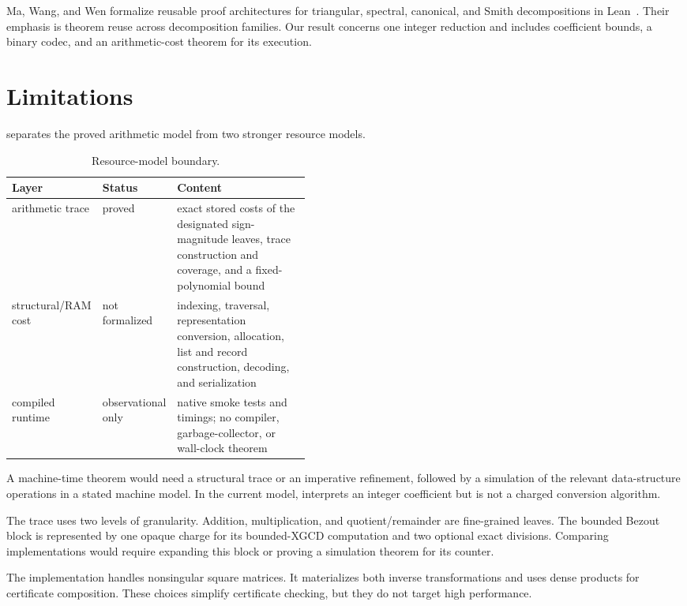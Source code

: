 \documentclass[11pt]{article}
\theoremstyle{definition}
\newcommand{\code}[1]{\texttt{\detokenize{#1}}}
\begin{document}
Ma, Wang, and Wen formalize reusable proof architectures for triangular, spectral, canonical, and Smith decompositions in Lean~\cite{ma2026}.  Their emphasis is theorem reuse across decomposition families.  Our result concerns one integer reduction and includes coefficient bounds, a binary codec, and an arithmetic-cost theorem for its execution.

\section{Limitations}
\label{sec:limitations}

 separates the proved arithmetic model from two stronger resource models.
\begin{table}[H]
\centering
\footnotesize
\begin{tabularx}{\linewidth}{@{}p{0.24\linewidth}p{0.20\linewidth}X@{}}
\toprule
Layer & Status & Content \\
\midrule
arithmetic trace & proved & exact stored costs of the designated sign-magnitude leaves, trace construction and coverage, and a fixed-polynomial bound \\
structural/RAM cost & not formalized & indexing, traversal, representation conversion, allocation, list and record construction, decoding, and serialization \\
compiled runtime & observational only & native smoke tests and timings; no compiler, garbage-collector, or wall-clock theorem \\
\bottomrule
\end{tabularx}
\caption{Resource-model boundary.}
\label{tab:resourcelayers}
\end{table}
A machine-time theorem would need a structural trace or an imperative refinement, followed by a simulation of the relevant data-structure operations in a stated machine model.  In the current model, \code{SignMagnitude.ofInt} interprets an integer coefficient but is not a charged conversion algorithm.

The trace uses two levels of granularity.  Addition, multiplication, and quotient/remainder are fine-grained leaves.  The bounded Bezout block is represented by one opaque charge for its bounded-XGCD computation and two optional exact divisions.  Comparing implementations would require expanding this block or proving a simulation theorem for its counter.

The implementation handles nonsingular square matrices.  It materializes both inverse transformations and uses dense products for certificate composition.  These choices simplify certificate checking, but they do not target high performance.
\end{document}
